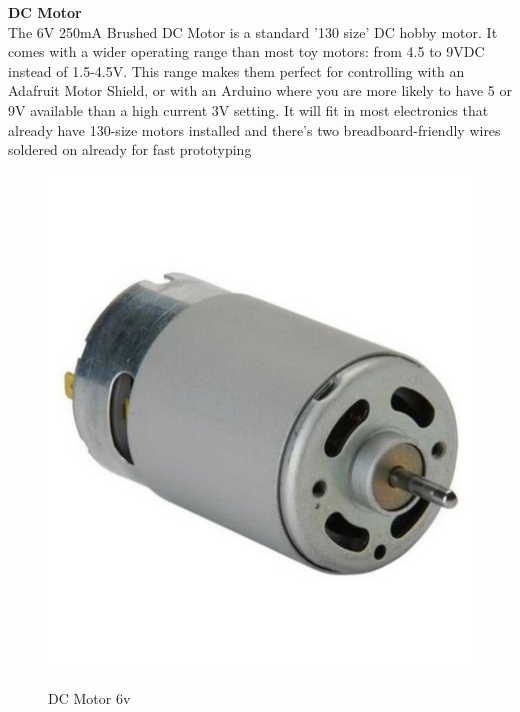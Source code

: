 \documentclass[a4paper,12pt]{article}
\begin{document}
\textbf{DC Motor}\\[1cm]
The 6V 250mA Brushed DC Motor is a standard '130 size' DC hobby motor. It comes with a wider
operating range than most toy motors: from 4.5 to 9VDC instead of 1.5-4.5V. This range makes them
perfect for controlling with an Adafruit Motor Shield, or with an Arduino where you are more likely to
have 5 or 9V available than a high current 3V setting. It will fit in most electronics that already have
130-size motors installed and there's two breadboard-friendly wires soldered on already for fast
prototyping\\
\begin{figure}[!h]
\centering
\includegraphics[scale=0.3]{dc.jpeg}\\
\caption{DC Motor 6v}
\end{figure}
\end{document}
